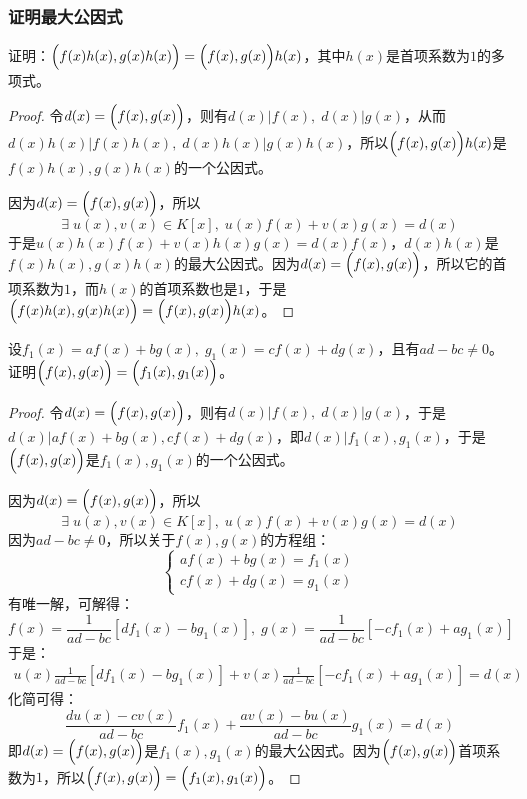 \subsubsection{证明最大公因式}
\begin{theorem}\label{example:1.19}
	证明：$\Bigl(f(x)h(x),g(x)h(x)\Bigr)=\Bigl(f(x),g(x)\Bigr)h(x)$，其中$h(x)$是首项系数为$1$的多项式。
\end{theorem}
\begin{proof}
	令$d(x)=\Bigl(f(x),g(x)\Bigr)$，则有$d(x)|f(x),\;d(x)|g(x)$，从而$d(x)h(x)|f(x)h(x),\;d(x)h(x)|g(x)h(x)$，所以$\Bigl(f(x),g(x)\Bigr)h(x)$是$f(x)h(x),g(x)h(x)$的一个公因式。\par
	因为$d(x)=\Bigl(f(x),g(x)\Bigr)$，所以
	\begin{equation*}
		\exists\;u(x),v(x)\in K[x],\;u(x)f(x)+v(x)g(x)=d(x)
	\end{equation*}
	于是$u(x)h(x)f(x)+v(x)h(x)g(x)=d(x)f(x)$，$d(x)h(x)$是$f(x)h(x),g(x)h(x)$的最大公因式。因为$d(x)=\Bigl(f(x),g(x)\Bigr)$，所以它的首项系数为$1$，而$h(x)$的首项系数也是$1$，于是$\Bigl(f(x)h(x),g(x)h(x)\Bigr)=\Bigl(f(x),g(x)\Bigr)h(x)$。
\end{proof}
\begin{theorem}
	设$f_1(x)=af(x)+bg(x),\;g_1(x)=cf(x)+dg(x)$，且有$ad-bc\ne0$。证明$\Bigl(f(x),g(x)\Bigr)=\Bigl(f_1(x),g_1(x)\Bigr)$。
\end{theorem}
\begin{proof}
	令$d(x)=\Bigl(f(x),g(x)\Bigr)$，则有$d(x)|f(x),\;d(x)|g(x)$，于是$d(x)|af(x)+bg(x),cf(x)+dg(x)$，即$d(x)|f_1(x),g_1(x)$，于是$\Bigl(f(x),g(x)\Bigr)$是$f_1(x),g_1(x)$的一个公因式。\par
	因为$d(x)=\Bigl(f(x),g(x)\Bigr)$，所以
	\begin{equation*}
		\exists\;u(x),v(x)\in K[x],\;u(x)f(x)+v(x)g(x)=d(x)
	\end{equation*}
	因为$ad-bc\ne0$，所以关于$f(x),g(x)$的方程组：
	\begin{equation*}
		\begin{cases}
			af(x)+bg(x)=f_1(x) \\
			cf(x)+dg(x)=g_1(x)
		\end{cases}
	\end{equation*}
	有唯一解，可解得：
	\begin{equation*}
		f(x)=\frac{1}{ad-bc}[df_1(x)-bg_1(x)],\;g(x)=\frac{1}{ad-bc}[-cf_1(x)+ag_1(x)]
	\end{equation*}
	于是：
	\begin{gather*}
		u(x)\frac{1}{ad-bc}[df_1(x)-bg_1(x)]+v(x)\frac{1}{ad-bc}[-cf_1(x)+ag_1(x)]=d(x)
	\end{gather*}
	化简可得：
	\begin{equation*}
		\frac{du(x)-cv(x)}{ad-bc}f_1(x)+\frac{av(x)-bu(x)}{ad-bc}g_1(x)=d(x)
	\end{equation*}
	即$d(x)=\Bigl(f(x),g(x)\Bigr)$是$f_1(x),g_1(x)$的最大公因式。因为$\Bigl(f(x),g(x)\Bigr)$首项系数为$1$，所以$\Bigl(f(x),g(x)\Bigr)=\Bigl(f_1(x),g_1(x)\Bigr)$。
\end{proof}
